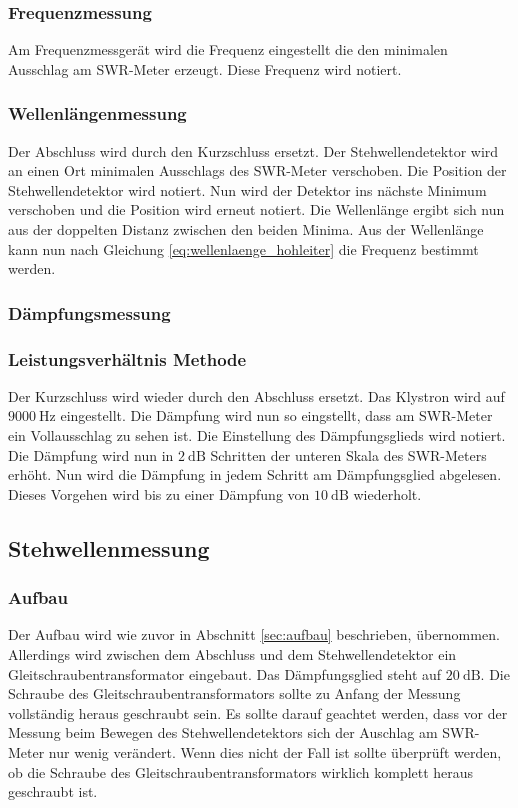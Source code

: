 \subsubsection{Frequenzmessung}
Am Frequenzmessgerät wird die Frequenz eingestellt die den minimalen Ausschlag am SWR-Meter erzeugt.
Diese Frequenz wird notiert.

\subsubsection{Wellenlängenmessung}
Der Abschluss wird durch den Kurzschluss ersetzt.
Der Stehwellendetektor wird an einen Ort minimalen Ausschlags des SWR-Meter verschoben.
Die Position der Stehwellendetektor wird notiert.
Nun wird der Detektor ins nächste Minimum verschoben und die Position wird erneut notiert.
Die Wellenlänge ergibt sich nun aus der doppelten Distanz zwischen den beiden Minima.
Aus der Wellenlänge kann nun nach Gleichung \ref{eq:wellenlaenge_hohleiter} die Frequenz bestimmt werden.

\subsubsection{Dämpfungsmessung}
\subsubsection{Leistungsverhältnis Methode}
Der Kurzschluss wird wieder durch den Abschluss ersetzt.
Das Klystron wird auf $\SI{9000}{\Hz}$ eingestellt.
Die Dämpfung wird nun so eingstellt, dass am SWR-Meter ein Vollausschlag zu sehen ist.
Die Einstellung des Dämpfungsglieds wird notiert.
Die Dämpfung wird nun in $\SI{2}{\dB}$ Schritten der unteren Skala des SWR-Meters erhöht.
Nun wird die Dämpfung in jedem Schritt am Dämpfungsglied abgelesen.
Dieses Vorgehen wird bis zu einer Dämpfung von $\SI{10}{\dB}$ wiederholt.

\subsection{Stehwellenmessung}
\subsubsection{Aufbau}
Der Aufbau wird wie zuvor in Abschnitt \ref{sec:aufbau} beschrieben, übernommen.
Allerdings wird zwischen dem Abschluss und dem Stehwellendetektor ein Gleitschraubentransformator eingebaut.
Das Dämpfungsglied steht auf $\SI{20}{\dB}$.
Die Schraube des Gleitschraubentransformators sollte zu Anfang der Messung vollständig heraus geschraubt sein.
Es sollte darauf geachtet werden, dass vor der Messung beim Bewegen des Stehwellendetektors sich der Auschlag am SWR-Meter nur wenig verändert.
Wenn dies nicht der Fall ist sollte überprüft werden, ob die Schraube des Gleitschraubentransformators wirklich komplett heraus geschraubt ist.

